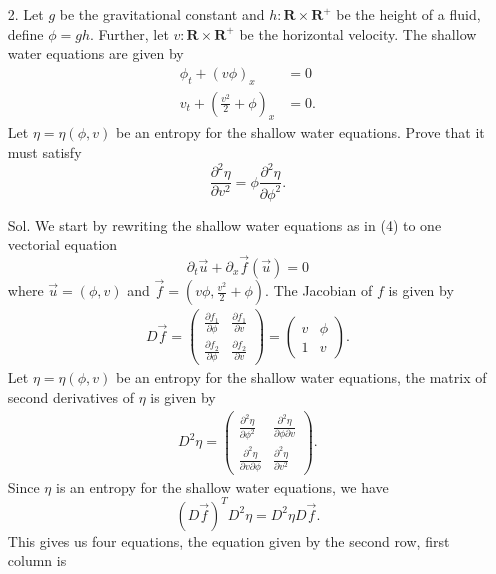 \documentclass[]{report}
\begin{document}
\begin{itemize}
	\item[2.] Let $g$ be the gravitational constant and $h : \mathbf{R} \times \mathbf{R}^{+}$ be the height of a fluid, define $\phi = gh$. Further, let $v : \mathbf{R} \times \mathbf{R}^{+}$ be the horizontal velocity. The shallow water equations are
	given by
	\begin{equation}
	\begin{split}
		\phi_t +(v\phi)_x &= 0\\
		v_t + \left(\frac{v^2}{2}+\phi\right)_x&=0.
	\end{split}
	\end{equation}
	Let $\eta = \eta(\phi, v)$ be an entropy for the shallow water equations. Prove that it must satisfy
	\begin{equation}
		\frac{\partial^2\eta}{\partial v^2} = \phi \frac{\partial^2\eta}{\partial\phi^2}.
	\end{equation}
	\item[Sol.] We start by rewriting the shallow water equations as in (4) to one vectorial equation
	\[\partial_t\vec{u}+\partial_x \vec{f}(\vec{u})=0\]
	where $\vec{u}=(\phi,v)$ and $\vec{f}=(v\phi,\frac{v^2}{2}+\phi)$. The Jacobian of $f$ is given by
	\begin{align*}
		D\vec{f}=\begin{pmatrix}
		\frac{\partial f_1}{\partial \phi}	& \frac{\partial f_1}{\partial v}\\
		\frac{\partial f_2}{\partial \phi}	& \frac{\partial f_2}{\partial v}\end{pmatrix}
		=\begin{pmatrix}
		v	& \phi\\
		1	& v
		\end{pmatrix}.
	\end{align*}
	Let $\eta = \eta(\phi, v)$ be an entropy for the shallow water equations, the matrix of second derivatives of $\eta$ is given by
	\begin{align*}
	D^2\eta=\begin{pmatrix}
	\frac{\partial^2 \eta}{\partial \phi^2}	& \frac{\partial^2 \eta}{\partial \phi \partial v}\\
	\frac{\partial^2 \eta}{\partial v \partial \phi}	& \frac{\partial^2  \eta}{\partial v^2}\end{pmatrix}.
	\end{align*}
	Since $\eta$ is an entropy for the shallow water equations, we have
	\[(D\vec{f})^T D^2\eta = D^2 \eta D\vec{f}.\]
	This gives us four equations, the equation given by the second row, first column is

\end{itemize}
\end{document}
